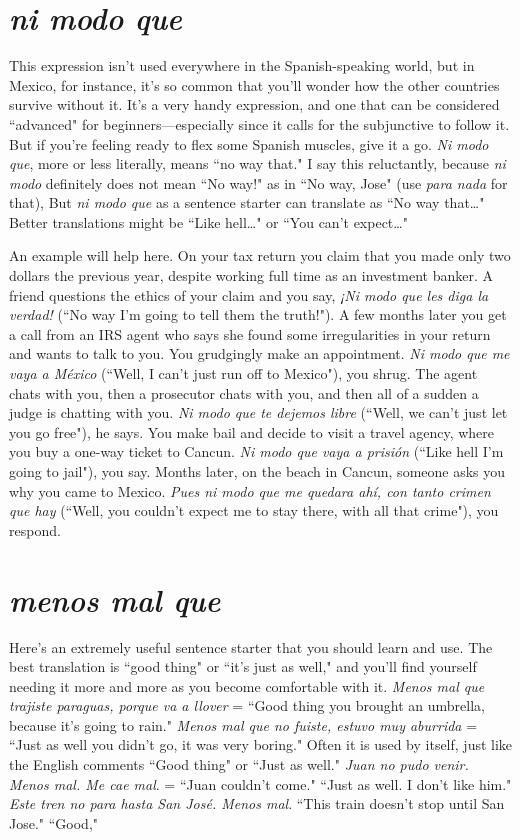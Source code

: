 \section{\emph{ni modo que}}

This expression isn't used everywhere in the Spanish-speaking
world, but in Mexico, for instance, it's so common that you'll wonder
how the other countries survive without it. It's a very handy expression, and one that can be considered ``advanced" for beginners---especially since it calls for the subjunctive to follow it. But if you're feeling
ready to flex some Spanish muscles, give it a go. \emph{Ni modo que}, more or
less literally, means ``no way that." I say this reluctantly, because \emph{ni
modo} definitely does not mean ``No way!" as in ``No way, Jose" (use
\emph{para nada} for that), But \emph{ni modo que} as a sentence starter can translate as ``No way that\ldots{}" Better translations might be ``Like hell\ldots{}"
or ``You can't expect\ldots{}"

An example will help here. On your tax return you claim that
you made only two dollars the previous year, despite working full time
as an investment banker. A friend questions the ethics of your claim
and you say, \emph{¡Ni modo que les diga la verdad!} (``No way I'm going to
tell them the truth!"). A few months later you get a call from an IRS
agent who says she found some irregularities in your return and wants
to talk to you. You grudgingly make an appointment. \emph{Ni modo que me
vaya a México} (``Well, I can't just run off to Mexico"), you shrug. The
agent chats with you, then a prosecutor chats with you, and then all of
a sudden a judge is chatting with you. \emph{Ni modo que te dejemos libre}
(``Well, we can't just let you go free"), he says. You make bail and decide to visit a travel agency, where you buy a one-way ticket to Cancun. \emph{Ni modo que vaya a prisión} (``Like hell I'm going to jail"), you
say. Months later, on the beach in Cancun, someone asks you why you
came to Mexico. \emph{Pues ni modo que me quedara ahí, con tanto crimen
que hay} (``Well, you couldn't expect me to stay there, with all that
crime"), you respond.

\section{\emph{menos mal que}}

Here's an extremely useful sentence starter that you should
learn and use. The best translation is ``good thing" or ``it's just as
well," and you'll find yourself needing it more and more as you become
comfortable with it. \emph{Menos mal que trajiste paraguas, porque va a
llover} = ``Good thing you brought an umbrella, because it's going to
rain." \emph{Menos mal que no fuiste, estuvo muy aburrida} = ``Just as well
you didn't go, it was very boring." Often it is used by itself, just like
the English comments ``Good thing" or ``Just as well." \emph{Juan no pudo
venir. Menos mal. Me cae mal}. = ``Juan couldn't come." ``Just as well.
I don't like him." \emph{Este tren no para hasta San José. Menos mal}.
``This train doesn't stop until San Jose." ``Good,"

